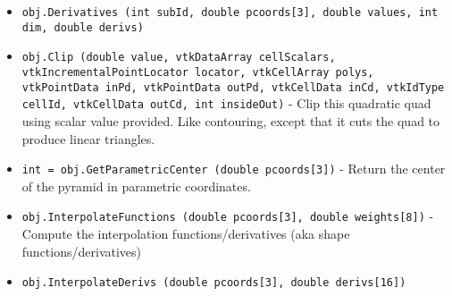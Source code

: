 \begin{itemize}
\item  \verb|obj.Derivatives (int subId, double pcoords[3], double values, int dim, double derivs)|

\item  \verb|obj.Clip (double value, vtkDataArray cellScalars, vtkIncrementalPointLocator locator, vtkCellArray polys, vtkPointData inPd, vtkPointData outPd, vtkCellData inCd, vtkIdType cellId, vtkCellData outCd, int insideOut)| -  Clip this quadratic quad using scalar value provided. Like contouring,
 except that it cuts the quad to produce linear triangles.

\item  \verb|int = obj.GetParametricCenter (double pcoords[3])| -  Return the center of the pyramid in parametric coordinates.

\item  \verb|obj.InterpolateFunctions (double pcoords[3], double weights[8])| -  Compute the interpolation functions/derivatives
 (aka shape functions/derivatives)

\item  \verb|obj.InterpolateDerivs (double pcoords[3], double derivs[16])|

\end{itemize}
